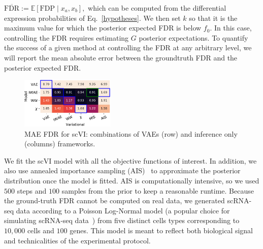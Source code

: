 \(
\overline{\mathrm{FDR}} := \mathbb{E}\left[\mathrm{FDP} \mid x_a, x_b\right],
\)
which can be computed from the differential expression probabilities of Eq.~\eqref{hypotheses}. We then set $k$ so that it is the maximum value for which the posterior expected FDR is below $f_0$. 
In this case, controlling the FDR requires estimating $G$ posterior expectations. %
To quantify the success of a given method at controlling the FDR at any arbitrary level, we will report the mean absolute error between the groundtruth FDR and the posterior expected FDR. 

\begin{figure}
\centering
\captionsetup{type=table}

\end{figure}

\begin{figure}
\centering
\includegraphics[width=0.4\textwidth]{figures/fdr_l1_err_cross.pdf}
\caption[MAE FDR for scVI]{MAE FDR for scVI: combinations of VAEs (row) and inference only (columns) frameworks. }\label{fig:scVI-cross}
\end{figure}

We fit the scVI model with all the objective functions of interest. In addition, we also use annealed importance sampling (AIS)~\cite{neal2001annealed} to approximate the posterior distribution once the model is fitted. AIS is computationally intensive, so we used $500$ steps and $100$ samples from the prior to keep a reasonable runtime. Because the ground-truth FDR cannot be computed on real data, we generated scRNA-seq data according to a Poisson Log-Normal model (a popular choice for simulating scRNA-seq data~\cite{townes2019feature,Crowell713412}) from five distinct cells types corresponding to $10,000$ cells and $100$ genes. This model is meant to reflect both biological signal and technicalities of the experimental protocol. %


